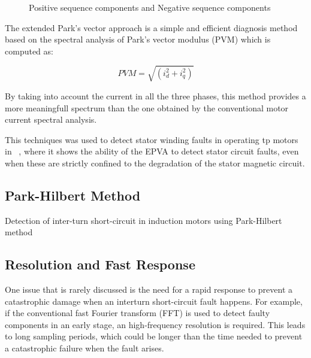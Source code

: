 \begin{figure}[htbp]
\centering
\caption{Positive sequence components and Negative sequence components }
\label{fig:park_vector_circle}
\end{figure}
 
 
 The extended Park's vector approach is a simple and efficient diagnosis method based on the spectral analysis of Park's vector modulus (PVM) which is computed as:
 
\begin{equation} \label{eq:parks_vector_modulus}
    PVM = \sqrt{(i_d^2 + i_q^2)}
\end{equation}

By taking into account the current in all the three phases, this method provides a more meaningfull spectrum than the one obtained by the conventional motor current spectral analysis.
 
This techniques was used to detect stator winding faults in operating \acrshort{tp} motors in  ~\cite{Cruz2001}, where it shows the ability of the EPVA to detect stator circuit faults, even when these are strictly confined to the degradation of the stator magnetic circuit.

\subsection{Park-Hilbert Method} %
\label{subsec:park_hilbert_method}

Detection of inter-turn short-circuit in induction motors using Park-Hilbert method ~\cite{Kia2013}



\subsection{Resolution and Fast Response} %
\label{subsec:resolution_fast_response}

One issue that is rarely discussed is the need for a rapid response to prevent a catastrophic damage when an interturn short-circuit fault happens. For example, if the conventional fast Fourier transform (FFT) is used to detect faulty components in an early stage, an high-frequency resolution is required. This leads to long sampling periods, which could be longer than the time needed to prevent a catastrophic failure when the fault arises. 

